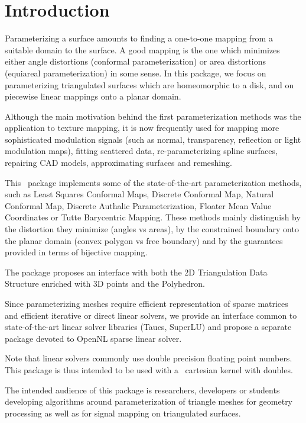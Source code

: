 \section{Introduction}

Parameterizing a surface amounts to finding a one-to-one mapping from
a suitable domain to the surface. A good mapping is the one which
minimizes either angle distortions (conformal parameterization) or
area distortions (equiareal parameterization) in some sense.  In this
package, we focus on parameterizing triangulated surfaces which are
homeomorphic to a disk, and on piecewise linear mappings onto a planar
domain.

Although the main motivation behind the first parameterization methods
was the application to texture mapping, it is now frequently used for
mapping more sophisticated modulation signals (such as normal,
transparency, reflection or light modulation maps), fitting scattered
data, re-parameterizing spline surfaces, repairing CAD models,
approximating surfaces and remeshing.

This \cgal\ package implements some of the state-of-the-art
parameterization methods, such as Least Squares Conformal Maps,
Discrete Conformal Map, Natural Conformal Map, Discrete Authalic
Parameterization, Floater Mean Value Coordinates or Tutte Barycentric
Mapping. These methods mainly distinguish by the distortion they
minimize (angles vs areas), by the constrained boundary onto the
planar domain (convex polygon vs free boundary) and by the guarantees
provided in terms of bijective mapping.

The package proposes an interface with both the 2D Triangulation Data
Structure enriched with 3D points and the Polyhedron.

Since parameterizing meshes require efficient representation of sparse
matrices and efficient iterative or direct linear solvers, we provide
an interface common to state-of-the-art linear solver libraries ({\sc Taucs},
SuperLU) and propose a separate package devoted to OpenNL sparse
linear solver.

Note that linear solvers commonly use double precision floating point
numbers. This package is thus intended to be used with a \cgal\
cartesian kernel with doubles.

The intended audience of this package is researchers, developers or
students developing algorithms around parameterization of triangle
meshes for geometry processing as well as for signal mapping on
triangulated surfaces.

